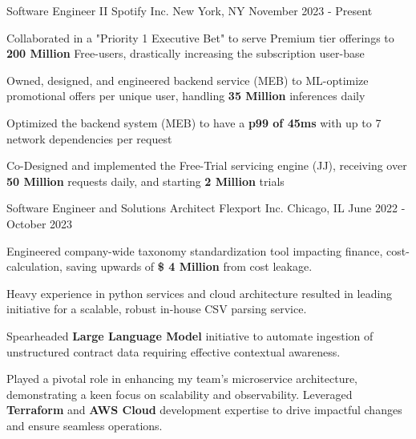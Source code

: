 

\begin{cventries}

  \cventry
  {Software Engineer II} %
  {Spotify Inc.} %
  {New York, NY} %
  {November 2023 - Present} %
  {
    \begin{cvitems} %
      \item {Collaborated in a "Priority 1 Executive Bet" to serve Premium tier offerings to \textbf{200 Million} Free-users, drastically increasing the subscription user-base}
      \item {Owned, designed, and engineered backend service (MEB) to ML-optimize promotional offers per unique user, handling \textbf{35 Million} inferences daily}
      \item {Optimized the backend system (MEB) to have a \textbf{p99 of 45ms} with up to 7 network dependencies per request}
      \item {Co-Designed and implemented the Free-Trial servicing engine (JJ), receiving over \textbf{50 Million} requests daily, and starting \textbf{2 Million} trials}
    \end{cvitems}
  }

\cventry
    {Software Engineer and Solutions Architect} %
    {Flexport Inc.} %
    {Chicago, IL} %
    {June 2022 - October 2023} %
    {
      \begin{cvitems} %
        \item {Engineered company-wide taxonomy standardization tool impacting finance, cost-calculation, saving upwards of \textbf{\$ 4 Million} from cost leakage.}
        \item {Heavy experience in python services and cloud architecture resulted in leading initiative for a scalable, robust in-house CSV parsing service.}
        \item{Spearheaded \textbf{Large Language Model} initiative to automate ingestion of unstructured contract data requiring effective contextual awareness.}
        \item{Played a pivotal role in enhancing my team's microservice architecture, demonstrating a keen focus on scalability and observability. Leveraged \textbf{Terraform} and \textbf{AWS Cloud} development expertise to drive impactful changes and ensure seamless operations.}
      \end{cvitems}
    }


\end{cventries}
